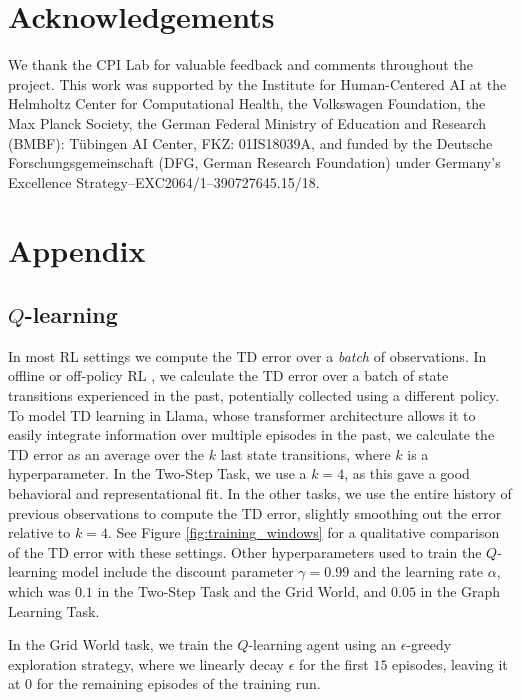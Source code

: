 \documentclass{article} %
\begin{document}
\section*{Acknowledgements}

We thank the CPI Lab for valuable feedback and comments throughout the project. This work was supported by the Institute for Human-Centered AI at the Helmholtz Center for Computational Health, the Volkswagen Foundation, the Max Planck Society, the German Federal Ministry of Education and Research (BMBF): Tübingen AI Center, FKZ: 01IS18039A, and funded by the Deutsche Forschungsgemeinschaft (DFG, German Research Foundation) under Germany’s Excellence Strategy–EXC2064/1–390727645.15/18.

\newpage


\newpage
\appendix
\section{Appendix}

\subsection{\texorpdfstring{$Q$}{Q}-learning}\label{appendix:q}

In most RL settings we compute the TD error over a \emph{batch} of observations. In offline or off-policy RL \citep{haarnoja2018soft}, we calculate the TD error over a batch of state transitions experienced in the past, potentially collected using a different policy. To model TD learning in Llama, whose transformer architecture allows it to easily integrate information over multiple episodes in the past, we calculate the TD error as an average over the $k$ last state transitions, where $k$ is a hyperparameter. In the Two-Step Task, we use a $k=4$, as this gave a good behavioral and representational fit. In the other tasks, we use the entire history of previous observations to compute the TD error, slightly smoothing out the error relative to $k=4$. See Figure \ref{fig:training_windows} for a qualitative comparison of the TD error with these settings. Other hyperparameters used to train the $Q$-learning model include the discount parameter $\gamma=0.99$ and the learning rate $\alpha$, which was $0.1$ in the Two-Step Task and the Grid World, and $0.05$ in the Graph Learning Task.

In the Grid World task, we train the $Q$-learning agent using an $\epsilon$-greedy exploration strategy, where we linearly decay $\epsilon$ for the first $15$ episodes, leaving it at $0$ for the remaining episodes of the training run.
\end{document}
